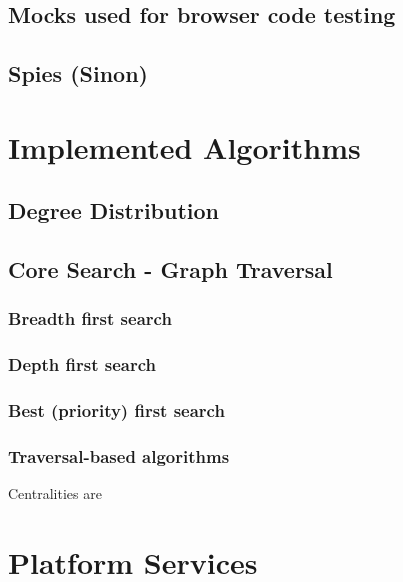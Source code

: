 	\subsection{Mocks used for browser code testing}
	\label{ssect:mocks}

	\subsection{Spies (Sinon)}
	\label{ssect:spies}


\section{Implemented Algorithms}
\label{sect:implemented_algos}

	\subsection{Degree Distribution}
	\label{ssect:deg_dist}

	\subsection{Core Search - Graph Traversal}
	\label{ssect:core_search}
	
		\subsubsection{Breadth first search}
		\label{sssect:search_bfs}
		
		\subsubsection{Depth first search}
		\label{sssect:search_dfs}
		
		\subsubsection{Best (priority) first search}
		\label{sssect:search_pfs}
		
		\subsubsection{Traversal-based algorithms}
		\label{sssect:travseral_algos}
		
		Centralities are 
	
	
\section{Platform Services}
\label{sect:platform_services}

